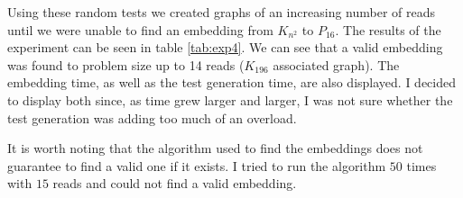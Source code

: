 Using these random tests we created graphs of an increasing number of reads until we were unable to find an embedding from $K_{n^2}$ to $P_{16}$. The results of the experiment can be seen in table \ref{tab:exp4}. We can see that a valid embedding was found to problem size up to 14 reads ($K_{196}$ associated graph). The embedding time, as well as the test generation time, are also displayed. I decided to display both since, as time grew larger and larger, I was not sure whether the test generation was adding too much of an overload.

\begin{table}[H]
	\centering
	\caption{Results of experiment 4}
	\label{tab:exp4}
\end{table}

It is worth noting that the algorithm used to find the embeddings does not guarantee to find a valid one if it exists. I tried to run the algorithm $50$ times with $15$ reads and could not find a valid embedding.

